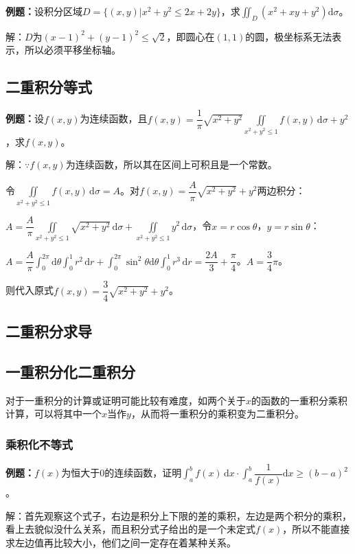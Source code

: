 \documentclass[UTF8, 12pt]{ctexart}
\begin{document}
\textbf{例题：}设积分区域$D=\{(x,y)\vert x^2+y^2\leqslant2x+2y\}$，求$\iint_D(x^2+xy+y^2)\textrm{d}\sigma$。

解：$D$为$(x-1)^2+(y-1)^2\leqslant\sqrt{2}$，即圆心在$(1,1)$的圆，极坐标系无法表示，所以必须平移坐标轴。

\subsection{二重积分等式}

\textbf{例题：}设$f(x,y)$为连续函数，且$f(x,y)=\dfrac{1}{\pi}\sqrt{x^2+y^2}\iint\limits_{x^2+y^2\leqslant1}f(x,y)\,\textrm{d}\sigma+y^2$，求$f(x,y)$。

解：$\because f(x,y)$为连续函数，所以其在区间上可积且是一个常数。

令$\iint\limits_{x^2+y^2\leqslant1}f(x,y)\,\textrm{d}\sigma=A$。对$f(x,y)=\dfrac{A}{\pi}\sqrt{x^2+y^2}+y^2$两边积分：

$A=\dfrac{A}{\pi}\iint\limits_{x^2+y^2\leqslant1}\sqrt{x^2+y^2}\,\textrm{d}\sigma+\iint\limits_{x^2+y^2\leqslant1}y^2\,\textrm{d}\sigma$，令$x=r\cos\theta$，$y=r\sin\theta$：

$A=\dfrac{A}{\pi}\int_0^{2\pi}\textrm{d}\theta\int_0^1r^2\,\textrm{d}r+\int_0^{2\pi}\sin^2\theta\textrm{d}\theta\int_0^1r^3\,\textrm{d}r=\dfrac{2A}{3}+\dfrac{\pi}{4}$。$A=\dfrac{3}{4}\pi$。

则代入原式$f(x,y)=\dfrac{3}{4}\sqrt{x^2+y^2}+y^2$。

\subsection{二重积分求导}

\subsection{一重积分化二重积分}

对于一重积分的计算或证明可能比较有难度，如两个关于$x$的函数的一重积分乘积计算，可以将其中一个$x$当作$y$，从而将一重积分的乘积变为二重积分。

\subsubsection{乘积化不等式}

\textbf{例题：}$f(x)$为恒大于0的连续函数，证明$\displaystyle{\int_a^bf(x)\,\textrm{d}x\cdot\int_a^b\dfrac{1}{f(x)}\textrm{d}x\geqslant(b-a)^2}$。

解：首先观察这个式子，右边是积分上下限的差的乘积，左边是两个积分的乘积，看上去貌似没什么关系，而且积分式子给出的是一个未定式$f(x)$，所以不能直接求左边值再比较大小，他们之间一定存在着某种关系。
\end{document}
